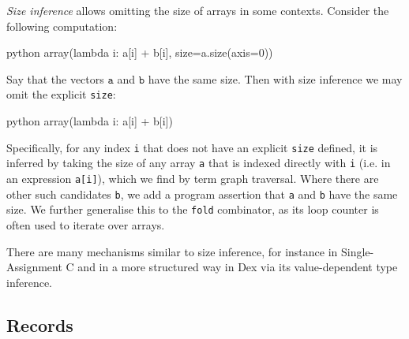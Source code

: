 \textit{Size inference} allows omitting the size of arrays in some contexts. Consider the following computation:
\begin{center} 
\begin{cminted}{python}
array(lambda i: a[i] + b[i], size=a.size(axis=0))
\end{cminted} 
\end{center}
Say that the vectors $\texttt{a}$ and $\texttt{b}$ have the same size. Then with size inference we may omit the explicit \texttt{size}:
\begin{center} 
\begin{cminted}{python}
array(lambda i: a[i] + b[i])
\end{cminted} 
\end{center}
Specifically, for any index \texttt{i} that does not have an explicit \texttt{size} defined, it is inferred by taking the size of any array \texttt{a} that is indexed directly with \texttt{i} (i.e. in an expression \texttt{a[i]}), which we find by term graph traversal. Where there are other such candidates \texttt{b}, we add a program assertion that \texttt{a} and \texttt{b} have the same size. We further generalise this to the \texttt{fold} combinator, as its loop counter is often used to iterate over arrays.


There are many mechanisms similar to size inference, for instance in Single-Assignment C and in a more structured way in Dex via its value-dependent type inference. 

\subsection{Records}


